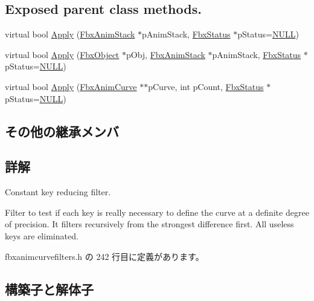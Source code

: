 \subsection*{Exposed parent class methods.}
\begin{DoxyCompactItemize}
\item 
virtual bool \hyperlink{class_fbx_anim_curve_filter_constant_key_reducer_a723169c1dc3a2d9557eb03908055c277}{Apply} (\hyperlink{class_fbx_anim_stack}{Fbx\+Anim\+Stack} $\ast$p\+Anim\+Stack, \hyperlink{class_fbx_status}{Fbx\+Status} $\ast$p\+Status=\hyperlink{fbxarch_8h_a070d2ce7b6bb7e5c05602aa8c308d0c4}{N\+U\+LL})
\item 
virtual bool \hyperlink{class_fbx_anim_curve_filter_constant_key_reducer_a08bf131629e3e1bc798a342cd479c2e4}{Apply} (\hyperlink{class_fbx_object}{Fbx\+Object} $\ast$p\+Obj, \hyperlink{class_fbx_anim_stack}{Fbx\+Anim\+Stack} $\ast$p\+Anim\+Stack, \hyperlink{class_fbx_status}{Fbx\+Status} $\ast$p\+Status=\hyperlink{fbxarch_8h_a070d2ce7b6bb7e5c05602aa8c308d0c4}{N\+U\+LL})
\item 
virtual bool \hyperlink{class_fbx_anim_curve_filter_constant_key_reducer_aea1789418ec3f29dba7805f2782e843c}{Apply} (\hyperlink{class_fbx_anim_curve}{Fbx\+Anim\+Curve} $\ast$$\ast$p\+Curve, int p\+Count, \hyperlink{class_fbx_status}{Fbx\+Status} $\ast$p\+Status=\hyperlink{fbxarch_8h_a070d2ce7b6bb7e5c05602aa8c308d0c4}{N\+U\+LL})
\end{DoxyCompactItemize}
\subsection*{その他の継承メンバ}


\subsection{詳解}
Constant key reducing filter.

Filter to test if each key is really necessary to define the curve at a definite degree of precision. It filters recursively from the strongest difference first. All useless keys are eliminated. 

 fbxanimcurvefilters.\+h の 242 行目に定義があります。



\subsection{構築子と解体子}
\mbox{\label{class_fbx_anim_curve_filter_constant_key_reducer_a5baf6160f4bf332b9235e0d1abb1aa3a}} 
